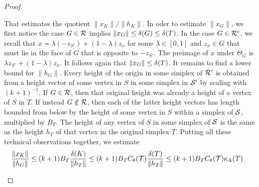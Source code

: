 \documentclass[10pt,a4paper]{article}
\begin{document}
\begin{proof}
\begin{itemize}
        That estimates the quotient $\| x_K \| / \| h_K \|$. 
        In oder to estimate $\|x_{G}\|$, we first notice the case $G \in {\mathcal R}$ implies $\|x_{G}\| \leq {\delta}(G) \leq {\delta}(T)$. 
        In the case $G \in {\mathcal R}^{c}$, we recall that $x = \lambda (-z_{S'}) + (1-\lambda) z_{x}$ for some $\lambda \in [0,1]$ and $z_{x} \in G$
        that must lie in the face of $G$ that is opposite to $-z_{S'}$. 
        The preimage of $x$ under $\Theta_{{G}}$ is $\lambda z_{S'} + (1-\lambda) z_{x}$. 
        It follows again that $\|x_{G}\| \leq {\delta}(T)$. 
        It remains to find a lower bound for $\| h_{G} \|$.
        Every height of the origin in some simplex of ${\mathcal R}'$ is obtained from a height vector of some vertex in $S$ in some simplex in ${\mathcal S}'$
        by scaling with $(k+1)^{-1}$. If $G \in {\mathcal R}$, then that original height was already a height of a vertex of $S$ in $T$. 
        If instead $G \notin {\mathcal R}$, then each of the latter height vectors has length bounded from below by the height of some vertex in $S$ within a simplex of ${\mathcal S}$, multiplied by $B_{T}$. The height of any vertex of $S$ in some simplex of ${\mathcal S}$ is the same as the height $h_T$ of that vertex in the original simplex $T$. 
        Putting all these technical observations together, we estimate 
        \begin{align*}
            \frac{ \| x_{K} \| }{ \| h_{{G}} \| }
            &\leq 
            (k+1)B_{T}
            \frac{ \diam(K) }{ \| h_{T} \| }
            \leq 
            (k+1)B_{T}
            \diameterratio(\calT)
            \frac{ \diam(T) }{ \| h_{T} \| }
            \leq 
            (k+1)B_{T}
            \diameterratio(\calT)
            \aspectratio(T) %

\end{align*}
\end{itemize}
\end{proof}
\end{document}
